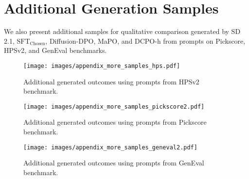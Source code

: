\newpage
\section{Additional Generation Samples}
\label{sec:app_additional_examples}
We also present additional samples for qualitative comparison generated by SD 2.1, \( \text{SFT}_{\text{Chosen}} \), Diffusion-DPO, MaPO, and DCPO-h from prompts on Pickscore, HPSv2, and GenEval benchmarks.

\begin{figure}[h]
    \centering
    \texttt{[image: images/appendix\_more\_samples\_hps.pdf]}
    \caption{Additional generated outcomes using prompts from HPSv2 benchmark.}
    \label{fig:enter-label}
\end{figure}

\begin{figure}[h]
    \centering
    \texttt{[image: images/appendix\_more\_samples\_pickscore2.pdf]}
    \caption{Additional generated outcomes using prompts from Pickscore benchmark.}
    \label{fig:enter-label}
\end{figure}

\begin{figure}[h]
    \centering
    \texttt{[image: images/appendix\_more\_samples\_geneval2.pdf]}
    \caption{Additional generated outcomes using prompts from GenEval benchmark.}
    \label{fig:enter-label}
\end{figure}

